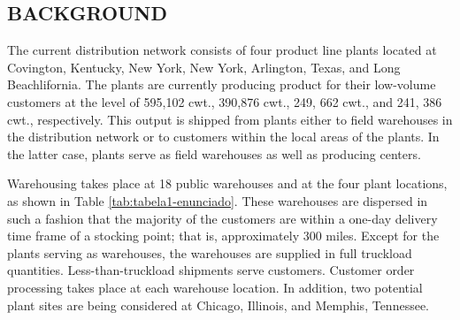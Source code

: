 \documentclass[12pt,a4paper]{article}
\begin{document}
\subsection{BACKGROUND}

The current distribution network consists of four product line plants located
at Covington, Kentucky, New York, New York, Arlington, Texas, and Long Beachlifornia.
The plants are currently producing product for their low-volume customers at the level of 595,102 cwt., 390,876 cwt., 249, 662 cwt., and 241, 386 cwt., respectively.
This output is shipped from plants either to field warehouses in the distribution network or to customers within the local areas of the plants.
In the latter case, plants serve as field warehouses as well as producing centers.

Warehousing takes place at 18 public warehouses and at the four plant locations, as shown in Table \ref{tab:tabela1-enunciado}.
These warehouses are dispersed in such a fashion that the majority of the customers are within a one-day delivery time frame of a stocking point; that is, approximately 300 miles.
Except for the plants serving as warehouses, the warehouses are supplied in full truckload quantities.
Less-than-truckload shipments serve customers.
Customer order processing takes place at each warehouse location.
In addition, two potential plant sites are being considered at Chicago, Illinois, and Memphis, Tennessee.
\end{document}
